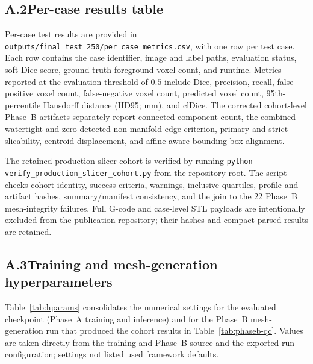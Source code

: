 \documentclass[anonymous]{iopjournal}
\begin{document}
\subsection*{A.2\quad Per-case results table}

Per-case test results are provided in \texttt{outputs/final\_test\_250/per\_case\_metrics.csv}, with one row per test case. Each row contains the case identifier, image and label paths, evaluation status, soft Dice score, ground-truth foreground voxel count, and runtime.
Metrics reported at the evaluation threshold of $0.5$ include Dice, precision, recall, false-positive voxel count, false-negative voxel count, predicted voxel count, 95th-percentile Hausdorff distance (HD95; mm), and clDice.
The corrected cohort-level Phase~B artifacts separately report connected-component count, the combined watertight and zero-detected-non-manifold-edge criterion, primary and strict slicability, centroid displacement, and affine-aware bounding-box alignment.

The retained production-slicer cohort is verified by running \texttt{python verify\_production\_slicer\_cohort.py} from the repository root. The script checks cohort identity, success criteria, warnings, inclusive quartiles, profile and artifact hashes, summary/manifest consistency, and the join to the 22 Phase~B mesh-integrity failures. Full G-code and case-level STL payloads are intentionally excluded from the publication repository; their hashes and compact parsed results are retained.

\subsection*{A.3\quad Training and mesh-generation hyperparameters}

Table~\ref{tab:hparams} consolidates the numerical settings for the evaluated checkpoint (Phase~A training and inference) and for the Phase~B mesh-generation run that produced the cohort results in Table~\ref{tab:phaseb-qc}. Values are taken directly from the training and Phase~B source and the exported run configuration; settings not listed used framework defaults.
\end{document}
